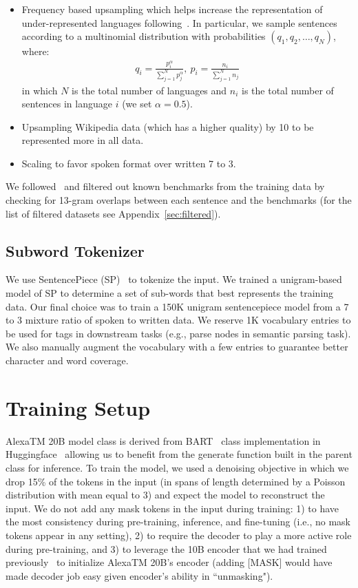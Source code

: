 \begin{itemize}
    \item Frequency based upsampling which helps increase the representation of under-represented languages following~\cite{Conneau2020UnsupervisedCR}. In particular, we sample sentences according to a multinomial distribution with probabilities $(q_1, q_2, \dots, q_N)$, where:
\begin{align}
q_i=\frac{p_i^\alpha}{\sum_{j=1}^N p_j^\alpha}, ~p_i=\frac{n_i}{\sum_{j=1}^N n_j}
\end{align}
in which $N$ is the total number of languages and $n_i$ is the total number of sentences in language $i$ (we set $\alpha=0.5$).
    \item Upsampling Wikipedia data (which has a higher quality) by 10 to be represented more in all data.
    \item Scaling to favor spoken format over written 7 to 3.
\end{itemize}

We followed~\cite{Brown2020LanguageMA} and filtered out known benchmarks from the training data by checking for 13-gram overlaps between each sentence and the benchmarks (for the list of filtered datasets see Appendix~\ref{sec:filtered}).

\subsection{Subword Tokenizer}

We use SentencePiece (SP)~\citep{Kudo2018SentencePieceAS} to tokenize the input. We trained a unigram-based model of SP to determine a set of sub-words that best represents the training data. Our final choice was to train a 150K unigram sentencepiece model from a 7 to 3 mixture ratio of spoken to written data. We reserve 1K vocabulary entries to be used for tags in downstream tasks (e.g., parse nodes in semantic parsing task). We also manually augment the vocabulary with a few entries to guarantee better character and word coverage.

\section{Training Setup}
\label{sec:training-setup}

{AlexaTM 20B} model class is derived from BART~\citep{Lewis2020BARTDS} class implementation in Huggingface~\citep{Wolf2019HuggingFacesTS} allowing us to benefit from the {\ttfamily generate} function built in the parent class for inference. To train the model, we used a denoising objective in which we drop 15\% of the tokens in the input (in spans of length determined  by a Poisson distribution with mean equal to 3) and expect the model to reconstruct the input. We do not add any mask tokens in the input during training: 1) to have the most consistency during pre-training, inference, and fine-tuning (i.e., no mask tokens appear in any setting), 2) to require the decoder to play a more active role during pre-training, and 3) to leverage the 10B encoder that we had trained previously~\citep{FitzGerald2022AlexaTM} to initialize {AlexaTM 20B}'s encoder (adding [MASK] would have made decoder job easy given encoder's ability in ``unmasking").

